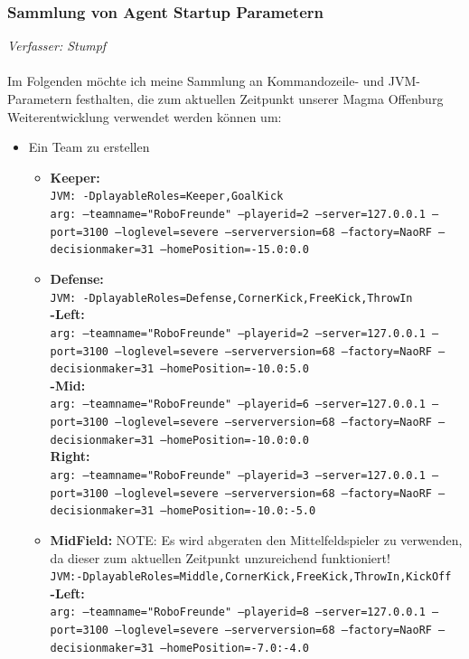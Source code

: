 \documentclass[fontsize=12pt,a4paper,final]{scrartcl}[2003/01/01]
\begin{document}
\subsubsection{Sammlung von Agent Startup Parametern}
\textit{Verfasser: Stumpf}\\
\\
Im Folgenden möchte ich meine Sammlung an Kommandozeile- und JVM-Parametern festhalten, die zum aktuellen Zeitpunkt unserer Magma Offenburg Weiterentwicklung verwendet werden können um:
\begin{itemize}
\item Ein Team zu erstellen
	\begin{itemize}
	\item \textbf{Keeper:}\\
\texttt{JVM: -DplayableRoles=Keeper,GoalKick\\
arg: --teamname="RoboFreunde" --playerid=2 --server=127.0.0.1 --		port=3100 --loglevel=severe --serverversion=68 --factory=NaoRF --		decisionmaker=31 --homePosition=-15.0:0.0}
	\item \textbf{Defense:}\\
\texttt{JVM: -DplayableRoles=Defense,CornerKick,FreeKick,ThrowIn}\\
\textbf{-Left:}\\
\texttt{arg: --teamname="RoboFreunde" --playerid=2 --server=127.0.0.1 --port=3100 --loglevel=severe --serverversion=68 --factory=NaoRF --decisionmaker=31 --homePosition=-10.0:5.0}\\
\textbf{-Mid:}\\
\texttt{arg: --teamname="RoboFreunde" --playerid=6 --server=127.0.0.1 --port=3100 --loglevel=severe --serverversion=68 --factory=NaoRF --decisionmaker=31 --homePosition=-10.0:0.0}\\
\textbf{Right:}\\
\texttt{arg: --teamname="RoboFreunde" --playerid=3 --server=127.0.0.1 --port=3100 --loglevel=severe --serverversion=68 --factory=NaoRF --decisionmaker=31 --homePosition=-10.0:-5.0}
	\item \textbf{MidField:} NOTE: Es wird abgeraten den Mittelfeldspieler zu verwenden, da dieser zum aktuellen Zeitpunkt unzureichend funktioniert!\\
\texttt{JVM:-DplayableRoles=Middle,CornerKick,FreeKick,ThrowIn,KickOff}\\
\textbf{-Left:}\\
\texttt{arg: --teamname="RoboFreunde" --playerid=8 --server=127.0.0.1 --port=3100 --loglevel=severe --serverversion=68 --factory=NaoRF --decisionmaker=31 --homePosition=-7.0:-4.0}\\

\end{itemize}
\end{itemize}
\end{document}

